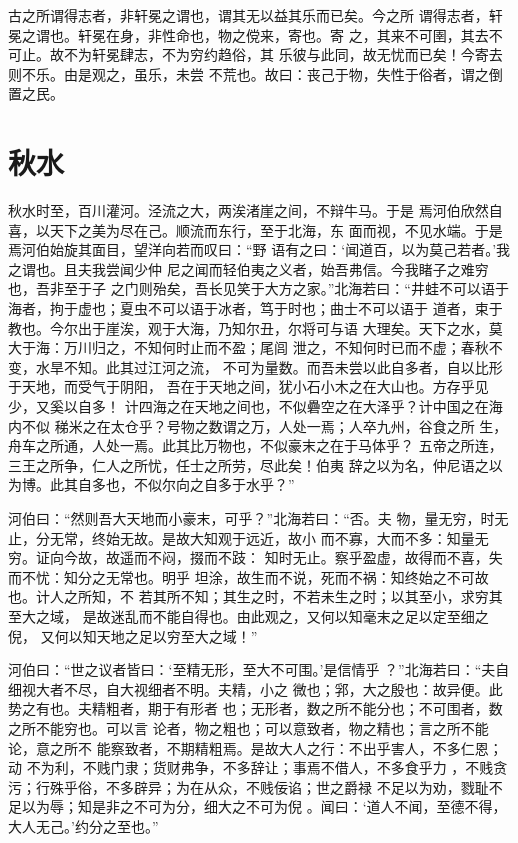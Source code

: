 \documentclass[a4paper,12pt,UTF8,twoside]{ctexbook}
\begin{document}
古之所谓得志者，非轩冕之谓也，谓其无以益其乐而已矣。今之所 谓得志者，轩冕之谓也。轩冕在身，非性命也，物之傥来，寄也。寄 之，其来不可圉，其去不可止。故不为轩冕肆志，不为穷约趋俗，其 乐彼与此同，故无忧而已矣！今寄去则不乐。由是观之，虽乐，未尝 不荒也。故曰：丧己于物，失性于俗者，谓之倒置之民。
\section{秋水}

秋水时至，百川灌河。泾流之大，两涘渚崖之间，不辩牛马。于是 焉河伯欣然自喜，以天下之美为尽在己。顺流而东行，至于北海，东 面而视，不见水端。于是焉河伯始旋其面目，望洋向若而叹曰：“野 语有之曰：‘闻道百，以为莫己若者。’我之谓也。且夫我尝闻少仲 尼之闻而轻伯夷之义者，始吾弗信。今我睹子之难穷也，吾非至于子 之门则殆矣，吾长见笑于大方之家。”北海若曰：“井蛙不可以语于海者，拘于虚也；夏虫不可以语于冰者，笃于时也；曲士不可以语于 道者，束于教也。今尔出于崖涘，观于大海，乃知尔丑，尔将可与语 大理矣。天下之水，莫大于海：万川归之，不知何时止而不盈；尾闾 泄之，不知何时已而不虚；春秋不变，水旱不知。此其过江河之流， 不可为量数。而吾未尝以此自多者，自以比形于天地，而受气于阴阳， 吾在于天地之间，犹小石小木之在大山也。方存乎见少，又奚以自多！ 计四海之在天地之间也，不似礨空之在大泽乎？计中国之在海内不似 稊米之在太仓乎？号物之数谓之万，人处一焉；人卒九州，谷食之所 生，舟车之所通，人处一焉。此其比万物也，不似豪末之在于马体乎？ 五帝之所连，三王之所争，仁人之所忧，任士之所劳，尽此矣！伯夷 辞之以为名，仲尼语之以为博。此其自多也，不似尔向之自多于水乎？”

河伯曰：“然则吾大天地而小豪末，可乎？”北海若曰：“否。夫 物，量无穷，时无止，分无常，终始无故。是故大知观于远近，故小 而不寡，大而不多：知量无穷。证向今故，故遥而不闷，掇而不跂： 知时无止。察乎盈虚，故得而不喜，失而不忧：知分之无常也。明乎 坦涂，故生而不说，死而不祸：知终始之不可故也。计人之所知，不 若其所不知；其生之时，不若未生之时；以其至小，求穷其至大之域， 是故迷乱而不能自得也。由此观之，又何以知毫末之足以定至细之倪， 又何以知天地之足以穷至大之域！”

河伯曰：“世之议者皆曰：‘至精无形，至大不可围。’是信情乎 ？”北海若曰：“夫自细视大者不尽，自大视细者不明。夫精，小之 微也；郛，大之殷也：故异便。此势之有也。夫精粗者，期于有形者 也；无形者，数之所不能分也；不可围者，数之所不能穷也。可以言 论者，物之粗也；可以意致者，物之精也；言之所不能论，意之所不 能察致者，不期精粗焉。是故大人之行：不出乎害人，不多仁恩；动 不为利，不贱门隶；货财弗争，不多辞让；事焉不借人，不多食乎力 ，不贱贪污；行殊乎俗，不多辟异；为在从众，不贱佞谄；世之爵禄 不足以为劝，戮耻不足以为辱；知是非之不可为分，细大之不可为倪 。闻曰：‘道人不闻，至德不得，大人无己。’约分之至也。”
\end{document}
